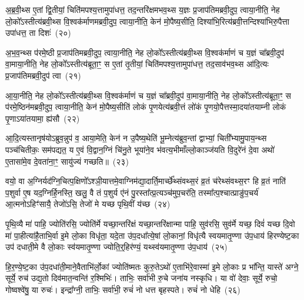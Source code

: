 अ॒ब्र॒वी॒थ्स ए॒तां द्वि॒तीयां॒ चिति॑मपश्य॒त्तामुपा॑धत्त॒ तद॒न्तरि॑क्षमभव॒थ्स य॒ज्ञः प्र॒जा\-प॑तिमब्रवी॒दुप॒ त्वाया॒नीति॒ नेह लो॒को᳚\-ऽस्तीत्य॑ब्रवी॒थ्स वि॒श्वक॑र्माणमब्रवी॒दुप॒ त्वाया॒नीति॒ केन॑ मो॒पैष्य॒सीति॒ दिश्या॑भि॒रित्य॑ब्रवी॒त्तन्दिश्या॑भिरु॒पैत्ता उपा॑धत्त॒ ता दिशः॑~(२०)

अ॒भ॒व॒न्थ्स प॑रमे॒ष्ठी प्र॒जा\-प॑तिमब्रवी॒दुप॒ त्वाया॒नीति॒ नेह लो॒को᳚\-ऽस्तीत्य॑ब्रवी॒थ्स वि॒श्वक॑र्माणं च य॒ज्ञं चा᳚ब्रवी॒दुप॑ वा॒माया॒नीति॒ नेह लो॒को᳚\-ऽस्तीत्य॑ब्रूता॒ꣳ॒ स ए॒तां तृ॒तीयां॒ चिति॑मपश्य॒त्तामुपा॑धत्त॒ तद॒साव॑भव॒थ्स आ॑दि॒त्यः प्र॒जा\-प॑तिमब्रवी॒दुप॑ त्वा~(२१)

आ॒या॒नीति॒ नेह लो॒को᳚\-ऽस्तीत्य॑ब्रवी॒थ्स वि॒श्वक॑र्माणं च य॒ज्ञं चा᳚ब्रवी॒दुप॑ वा॒माया॒नीति॒ नेह लो॒को᳚\-ऽस्तीत्य॑ब्रूता॒ꣳ॒ स प॑रमे॒ष्ठिन॑मब्रवी॒दुप॒ त्वाया॒नीति॒ केन॑ मो॒पैष्य॒सीति॑ लोकं पृ॒णयेत्य॑ब्रवी॒त्तं लो॑कं पृ॒णयो॒पैत्तस्मा॒दया॑तयाम्नी लोकं पृ॒णा\-ऽया॑तयामा॒ ह्य॑सौ~(२२)

आ॒दि॒त्यस्तानृष॑यो\-ऽब्रुव॒न्नुप॑ व॒ आया॒मेति॒ केन॑ न उ॒पैष्य॒थेति॑ भू॒म्नेत्य॑ब्रुव॒न्तां द्वाभ्यां॒ चिती᳚भ्यामु॒पाय॒न्थ्स पञ्च॑चितीकः॒ सम॑पद्यत॒ य ए॒वं वि॒द्वान॒ग्निं चि॑नु॒ते भूया॑ने॒व भ॑वत्य॒भीमाँल्लो॒काञ्ज॑यति वि॒दुरे॑नं दे॒वा अथो॑ ए॒तासा॑मे॒व दे॒वता॑ना॒ꣳ॒ सायु॑ज्यं गच्छति॥~(२३)

{\anuvakamend[{तम॑सा\-ऽऽ\-दि॒त्यो᳚\-ऽस्तीति॒ दिश॑ आदि॒त्यः प्र॒जा\-प॑तिमब्रवी॒दुप॑ त्वा॒\-ऽसौ पञ्च॑चत्वारिꣳशच्च}]}%

वयो॒ वा अ॒ग्निर्यद॑ग्नि॒चित्प॒क्षिणो᳚\-ऽश्ञी॒यात्तमे॒वाग्निम॑द्या॒दार्ति॒मार्च्छे᳚थ्संवथ्स॒रं व्र॒तं च॑रेथ्संवथ्स॒रꣳ हि व्र॒तं नाति॑ प॒शुर्वा ए॒ष यद॒ग्निर्\mbox{}हि॒नस्ति॒ खलु॒ वै तं प॒शुर्य ए॑नं पु॒रस्ता᳚त्प्र॒त्यञ्च॑मुप॒चर॑ति॒ तस्मा᳚त्प॒श्चात्प्राङु॑प॒चर्य॑ आ॒त्मनो\-ऽहिꣳ॑सायै॒ तेजो॑\-ऽसि॒ तेजो॑ मे यच्छ पृथि॒वीं य॑च्छ~(२४)

पृ॒थि॒व्यै मा॑ पाहि॒ ज्योति॑रसि॒ ज्योति॑र्मे यच्छा॒न्तरि॑क्षं यच्छा॒न्तरि॑क्षान्मा पाहि॒ सुव॑रसि॒ सुव॑र्मे यच्छ॒ दिवं॑ यच्छ दि॒वो मा॑ पा॒हीत्या॑है॒ताभि॒र्वा इ॒मे लो॒का विधृ॑ता॒ यदे॒ता उ॑प॒दधा᳚त्ये॒षां लो॒कानां॒ विधृ॑त्यै स्वयमातृ॒ण्णा उ॑प॒धाय॑ हिरण्येष्ट॒का उप॑ दधाती॒मे वै लो॒काः स्व॑यमातृ॒ण्णा ज्योति॒र्॒\mbox{}हिर॑ण्यं॒ यथ्स्व॑यमातृ॒ण्णा उ॑प॒धाय॑~(२५)

हि॒र॒ण्ये॒ष्ट॒का उ॑प॒दधा॑ती॒माने॒वैताभि॑र्लो॒कां ज्योति॑ष्मतः कुरु॒ते\-ऽथो॑ ए॒ताभि॑रे॒वास्मा॑ इ॒मे लो॒काः प्र भा᳚न्ति॒ यास्ते॑ अग्ने॒ सूर्ये॒ रुच॑ उद्य॒तो दिव॑मात॒न्वन्ति॑ र॒श्मिभिः॑। ताभिः॒ सर्वा॑भी रु॒चे जना॑य नस्कृधि। या वो॑ देवाः॒ सूर्ये॒ रुचो॒ गोष्वश्वे॑षु॒ या रुचः॑। इन्द्रा᳚ग्नी॒ ताभिः॒ सर्वा॑भी॒ रुचं॑ नो धत्त बृहस्पते। रुचं॑ नो धेहि~(२६)

